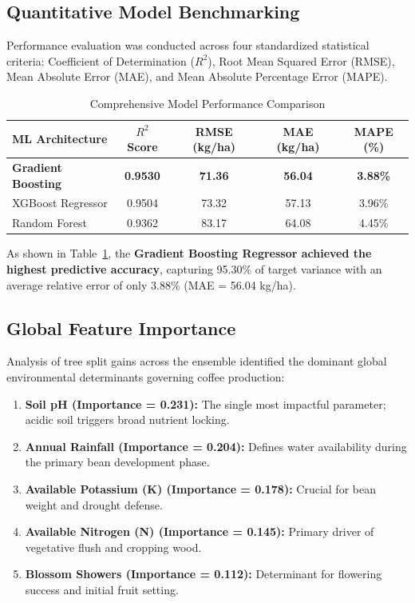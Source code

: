 \documentclass[conference]{IEEEtran}
\begin{document}
\subsection{Quantitative Model Benchmarking}
Performance evaluation was conducted across four standardized statistical criteria: Coefficient of Determination ($R^2$), Root Mean Squared Error (RMSE), Mean Absolute Error (MAE), and Mean Absolute Percentage Error (MAPE).

\begin{table}[htbp]
\caption{Comprehensive Model Performance Comparison}
\begin{center}
\begin{tabular}{lcccc}
\toprule
\textbf{ML Architecture} & \textbf{$R^2$ Score} & \textbf{RMSE (kg/ha)} & \textbf{MAE (kg/ha)} & \textbf{MAPE (\%)} \\
\midrule
\textbf{Gradient Boosting} & \textbf{0.9530} & \textbf{71.36} & \textbf{56.04} & \textbf{3.88\%} \\
XGBoost Regressor & 0.9504 & 73.32 & 57.13 & 3.96\% \\
Random Forest & 0.9362 & 83.17 & 64.08 & 4.45\% \\
\bottomrule
\end{tabular}
\label{tab:models}
\end{center}
\end{table}

As shown in Table~\ref{tab:models}, the \textbf{Gradient Boosting Regressor achieved the highest predictive accuracy}, capturing 95.30\% of target variance with an average relative error of only 3.88\% (MAE = 56.04 kg/ha).

\subsection{Global Feature Importance}
Analysis of tree split gains across the ensemble identified the dominant global environmental determinants governing coffee production:
\begin{enumerate}
    \item \textbf{Soil pH (Importance = 0.231):} The single most impactful parameter; acidic soil triggers broad nutrient locking.
    \item \textbf{Annual Rainfall (Importance = 0.204):} Defines water availability during the primary bean development phase.
    \item \textbf{Available Potassium (K) (Importance = 0.178):} Crucial for bean weight and drought defense.
    \item \textbf{Available Nitrogen (N) (Importance = 0.145):} Primary driver of vegetative flush and cropping wood.
    \item \textbf{Blossom Showers (Importance = 0.112):} Determinant for flowering success and initial fruit setting.
\end{enumerate}
\end{document}
